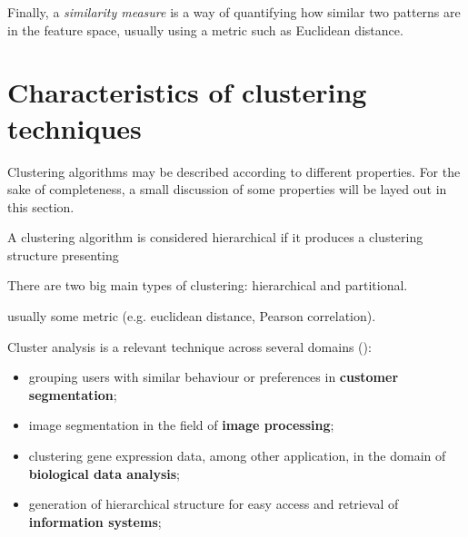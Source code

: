 Finally, a \emph{similarity measure} is a way of quantifying how similar two patterns are in the feature space, usually using a metric such as Euclidean distance.


\section{Characteristics of clustering techniques}

Clustering algorithms may be described according to different properties.
For the sake of completeness, a small discussion of some properties will be layed out in this section.

A clustering algorithm is considered hierarchical if it produces a clustering structure presenting 



There are two big main types of clustering: hierarchical and partitional.

usually some metric (e.g. euclidean distance, Pearson correlation). %






Cluster analysis is a relevant technique across several domains (\cite{Aggarwal2014}):

\begin{itemize}
	\item grouping users with similar behaviour or preferences in \textbf{customer segmentation};
	\item image segmentation in the field of \textbf{image processing};
	\item clustering gene expression data, among other application, in the domain of \textbf{biological data analysis};
	\item generation of hierarchical structure for easy access and retrieval of \textbf{information systems}; %
\end{itemize}




